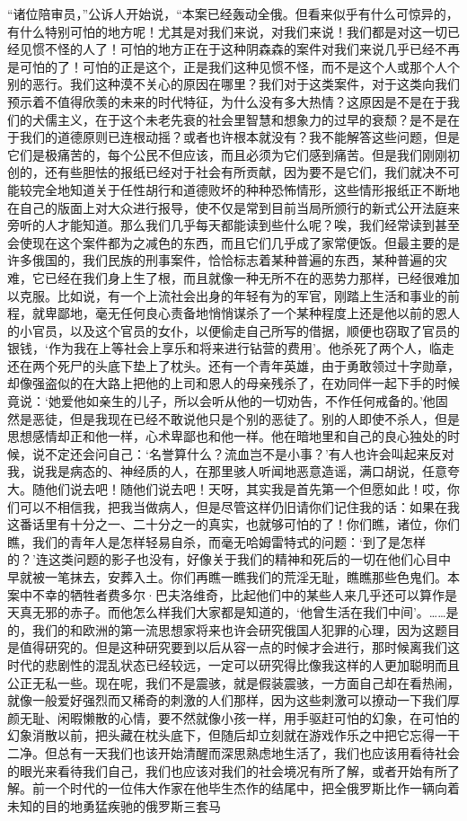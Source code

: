 \par “诸位陪审员，”公诉人开始说，“本案已经轰动全俄。但看来似乎有什么可惊异的，有什么特别可怕的地方呢！尤其是对我们来说，对我们来说！我们都是对这一切已经见惯不怪的人了！可怕的地方正在于这种阴森森的案件对我们来说几乎已经不再是可怕的了！可怕的正是这个，正是我们这种见惯不怪，而不是这个人或那个人个别的恶行。我们这种漠不关心的原因在哪里？我们对于这类案件，对于这类向我们预示着不值得欣羡的未来的时代特征，为什么没有多大热情？这原因是不是在于我们的犬儒主义，在于这个未老先衰的社会里智慧和想象力的过早的衰颓？是不是在于我们的道德原则已连根动摇？或者也许根本就没有？我不能解答这些问题，但是它们是极痛苦的，每个公民不但应该，而且必须为它们感到痛苦。但是我们刚刚初创的，还有些胆怯的报纸已经对于社会有所贡献，因为要不是它们，我们就决不可能较完全地知道关于任性胡行和道德败坏的种种恐怖情形，这些情形报纸正不断地在自己的版面上对大众进行报导，使不仅是常到目前当局所颁行的新式公开法庭来旁听的人才能知道。那么我们几乎每天都能读到些什么呢？唉，我们经常读到甚至会使现在这个案件都为之减色的东西，而且它们几乎成了家常便饭。但最主要的是许多俄国的，我们民族的刑事案件，恰恰标志着某种普遍的东西，某种普遍的灾难，它已经在我们身上生了根，而且就像一种无所不在的恶势力那样，已经很难加以克服。比如说，有一个上流社会出身的年轻有为的军官，刚踏上生活和事业的前程，就卑鄙地，毫无任何良心责备地悄悄谋杀了一个某种程度上还是他以前的恩人的小官员，以及这个官员的女仆，以便偷走自己所写的借据，顺便也窃取了官员的银钱，‘作为我在上等社会上享乐和将来进行钻营的费用’。他杀死了两个人，临走还在两个死尸的头底下垫上了枕头。还有一个青年英雄，由于勇敢领过十字勋章，却像强盗似的在大路上把他的上司和恩人的母亲残杀了，在劝同伴一起下手的时候竟说：‘她爱他如亲生的儿子，所以会听从他的一切劝告，不作任何戒备的。’他固然是恶徒，但是我现在已经不敢说他只是个别的恶徒了。别的人即使不杀人，但是思想感情却正和他一样，心术卑鄙也和他一样。他在暗地里和自己的良心独处的时候，说不定还会问自己：‘名誉算什么？流血岂不是小事？’有人也许会叫起来反对我，说我是病态的、神经质的人，在那里骇人听闻地恶意造谣，满口胡说，任意夸大。随他们说去吧！随他们说去吧！天呀，其实我是首先第一个但愿如此！哎，你们可以不相信我，把我当做病人，但是尽管这样仍旧请你们记住我的话：如果在我这番话里有十分之一、二十分之一的真实，也就够可怕的了！你们瞧，诸位，你们瞧，我们的青年人是怎样轻易自杀，而毫无哈姆雷特式的问题：‘到了是怎样的？’连这类问题的影子也没有，好像关于我们的精神和死后的一切在他们心目中早就被一笔抹去，安葬入土。你们再瞧一瞧我们的荒淫无耻，瞧瞧那些色鬼们。本案中不幸的牺牲者费多尔·巴夫洛维奇，比起他们中的某些人来几乎还可以算作是天真无邪的赤子。而他怎么样我们大家都是知道的，‘他曾生活在我们中间’。……是的，我们的和欧洲的第一流思想家将来也许会研究俄国人犯罪的心理，因为这题目是值得研究的。但是这种研究要到以后从容一点的时候才会进行，那时候离我们这时代的悲剧性的混乱状态已经较远，一定可以研究得比像我这样的人更加聪明而且公正无私一些。现在呢，我们不是震骇，就是假装震骇，一方面自己却在看热闹，就像一般爱好强烈而又稀奇的刺激的人们那样，因为这些刺激可以撩动一下我们厚颜无耻、闲暇懒散的心情，要不然就像小孩一样，用手驱赶可怕的幻象，在可怕的幻象消散以前，把头藏在枕头底下，但随后却立刻就在游戏作乐之中把它忘得一干二净。但总有一天我们也该开始清醒而深思熟虑地生活了，我们也应该用看待社会的眼光来看待我们自己，我们也应该对我们的社会境况有所了解，或者开始有所了解。前一个时代的一位伟大作家在他毕生杰作的结尾中，把全俄罗斯比作一辆向着未知的目的地勇猛疾驰的俄罗斯三套马